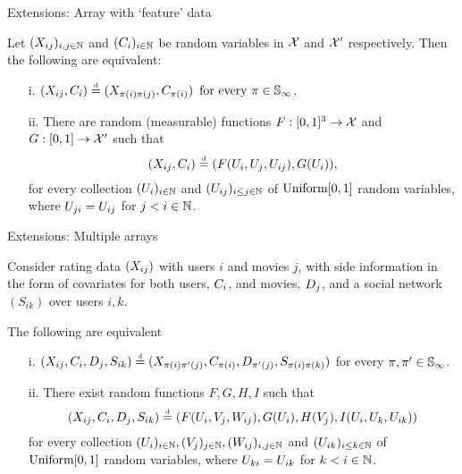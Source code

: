 \begin{frame}{Extensions: Array with `feature' data}
  \begin{block}{}
\begin{cor}
  \label{theorem:ahcov}
  Let $(X_{ij})_{i,j\in\mathbb{N}}$ and $(C_i)_{i\in\mathbb{N}}$ be random variables in $\mathcal{X}$ and $\mathcal{X}'$ respectively.  Then the following are equivalent:
\begin{enumerate}  
\item[i.] $(X_{ij}, C_i)\stackrel{\mbox{\tiny d}}{=}(X_{\pi(i)\pi(j)}, C_{\pi(i)}) \,\text{ for every }\pi\in\mathbb{S}_{\infty}$. 
\item[ii.] There are random (measurable) functions $F:[0,1]^3\rightarrow\mathcal{X}$ and $G:[0,1]\rightarrow\mathcal{X}'$ such that 
   \begin{equation}
    \label{eq:ah:cov}
    (X_{ij}, C_i)\stackrel{\mbox{\tiny d}}{=} (F(U_i,U_j,U_{ij}), G(U_i)),
  \end{equation}
for every collection $(U_i)_{i\in\mathbb{N}}$ and $(U_{ij})_{i\le j\in\mathbb{N}}$ of \iid $\mbox{\rm Uniform}[0,1]$ random variables, where $U_{ji} = U_{ij}$ for $j < i \in \mathbb{N}$.
\end{enumerate}
\end{cor}
  \end{block}
\end{frame}

\begin{frame}{Extensions: Multiple arrays}
  \begin{block}{}
Consider rating data $(X_{ij})$ with users $i$ and movies $j$, with side information in the form of covariates for both users, $C_i$, and movies, $D_j$, and a social network $(S_{ik})$ over users $i,k$.
\end{block}
  \begin{block}{}
\begin{cor}
The following are equivalent
\begin{enumerate}
\item[i.] $
(X_{ij}, C_i, D_j, S_{ik}) \stackrel{\mbox{\tiny d}}{=}
(X_{\pi(i)\pi'(j)}, C_{\pi(i)}, D_{\pi'(j)}, S_{\pi(i)\pi(k)})$ 
for every $\pi,\pi' \in \mathbb{S}_{\infty}$.
\item[ii.] There exist random functions $F,G,H,I$ such that
\[
(X_{ij}, C_i, D_j, S_{ik}) \stackrel{\mbox{\tiny d}}{=} (F(U_i,V_j,W_{ij}), G(U_i), H(V_j), I(U_i,U_k,U_{ik}))
\]
for every collection $(U_i)_{i\in\mathbb{N}}, (V_j)_{j\in\mathbb{N}}, (W_{ij})_{i, j\in\mathbb{N}}$ and $(U_{ik})_{i\le k\in\mathbb{N}}$ of \iid $\mbox{\rm Uniform}[0,1]$ random variables, where $U_{ki} = U_{ik}$ for $k < i \in \mathbb{N}$.
\end{enumerate}
\end{cor}
  \end{block}
\end{frame}

